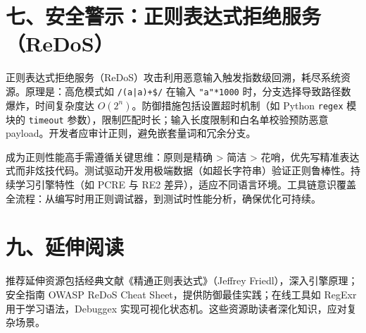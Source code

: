\chapter{七、安全警示：正则表达式拒绝服务（ReDoS）}
正则表达式拒绝服务（ReDoS）攻击利用恶意输入触发指数级回溯，耗尽系统资源。原理是：高危模式如 \verb!/(a|a)+$/! 在输入 \verb!"a"*1000! 时，分支选择导致路径数爆炸，时间复杂度达 $O(2^n)$。防御措施包括设置超时机制（如 Python \verb!regex! 模块的 \verb!timeout! 参数），限制匹配时长；输入长度限制和白名单校验预防恶意 payload。开发者应审计正则，避免嵌套量词和冗余分支。\par
成为正则性能高手需遵循关键思维：原则是精确 > 简洁 > 花哨，优先写精准表达式而非炫技代码。测试驱动开发用极端数据（如超长字符串）验证正则鲁棒性。持续学习引擎特性（如 PCRE 与 RE2 差异），适应不同语言环境。工具链意识覆盖全流程：从编写时用正则调试器，到测试时性能分析，确保优化可持续。\par
\chapter{九、延伸阅读}
推荐延伸资源包括经典文献《精通正则表达式》（Jeffrey Friedl），深入引擎原理；安全指南 OWASP ReDoS Cheat Sheet，提供防御最佳实践；在线工具如 RegExr 用于学习语法，Debuggex 实现可视化状态机。这些资源助读者深化知识，应对复杂场景。\par
